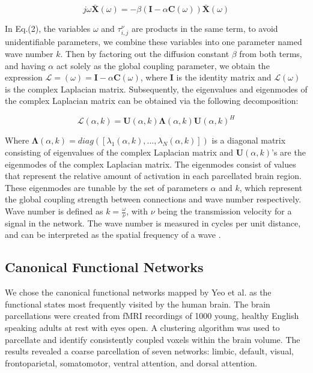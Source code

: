 \documentclass{article}
\begin{document}
\begin{equation}
\label{eq3}
j\omega \pmb{\bar{X}}(\omega) = -\beta (\pmb{I} - \alpha \pmb{C}(\omega)) \pmb{\bar{X}}(\omega)
\end{equation}

In Eq.(2), the variables $\omega$ and $\tau_{i,j}^{\nu}$ are products in the same term, to avoid unidentifiable parameters, we combine these variables into one parameter named wave number $k$. Then by factoring out the diffusion constant $\beta$ from both terms, and having $\alpha$ act solely as the global coupling parameter, we obtain the expression $\mathcal{L} = (\omega) = \pmb{I} - \alpha \pmb{C}(\omega)$, where $\pmb{I}$ is the identity matrix and $\mathcal{L}(\omega)$ is the complex Laplacian matrix. Subsequently, the eigenvalues and eigenmodes of the complex Laplacian matrix can be obtained via the following decomposition:

\begin{equation}
\label{eq4}
\bm{\mathcal{L}}(\alpha, k) = \bm{U}(\alpha, k)\bm{\Lambda}(\alpha, k)\bm{U}(\alpha, k)^{H}
\end{equation}

Where $\bm{\Lambda}(\alpha, k) = diag([\lambda_{1}(\alpha, k), ... , \lambda_{N}(\alpha, k)])$ is a diagonal matrix consisting of eigenvalues of the complex Laplacian matrix and $\bm{U}(\alpha, k)$'s are the eigenmodes of the complex Laplacian matrix. The eigenmodes consist of values that represent the relative amount of activation in each parcellated brain region. These eigenmodes are tunable by the set of parameters $\alpha$ and $k$, which represent the global coupling strength between connections and wave number respectively. Wave number is defined as $k = \frac{\omega}{\nu}$, with $\nu$ being the transmission velocity for a signal in the network. The wave number is measured in cycles per unit distance, and can be interpreted as the spatial frequency of a wave \cite{French1971}. 

\subsection{Canonical Functional Networks}
We chose the canonical functional networks mapped by Yeo et al. \cite{Yeo2011} as the functional states most frequently visited by the human brain. The brain parcellations were created from fMRI recordings of 1000 young, healthy English speaking adults at rest with eyes open. A clustering algorithm was used to parcellate and identify consistently coupled voxels within the brain volume. The results revealed a coarse parcellation of seven networks: limbic, default, visual, frontoparietal, somatomotor, ventral attention, and dorsal attention. 
\end{document}
